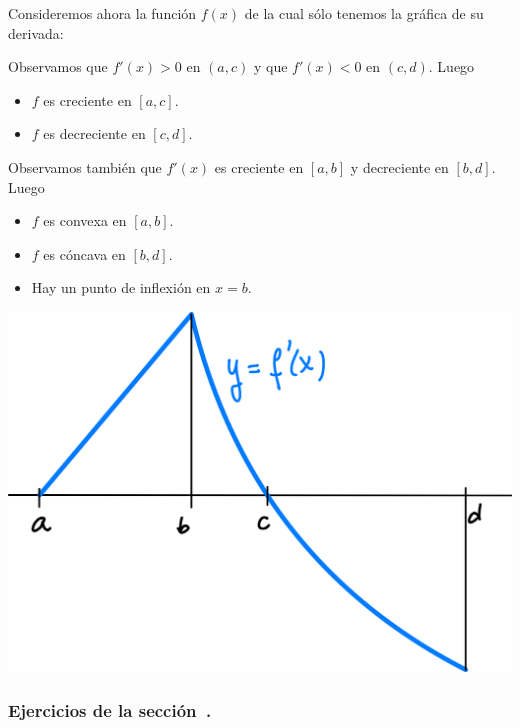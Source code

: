 \begin{example}
    Consideremos ahora la función $f(x)$ de la cual sólo tenemos la gráfica de su derivada:

    \noindent
    \begin{minipage}{.5\textwidth}
        Observamos que $f'(x)>0$ en $(a,c)$ y que $f'(x)<0$ en $(c,d)$. Luego
        \begin{itemize}
            \item $f$ es creciente en $[a,c]$.
            \item $f$ es decreciente en $[c,d]$.
        \end{itemize}
        Observamos también que $f'(x)$ es creciente en $[a,b]$ y decreciente en $[b,d]$. Luego
        \begin{itemize}
            \item $f$ es convexa en $[a,b]$.
            \item $f$ es cóncava en $[b,d]$.
            \item Hay un punto de inflexión en $x=b$.
        \end{itemize}
        \end{minipage}
    \begin{minipage}{.5\textwidth}
        \centering
        \includegraphics[width=.9\textwidth]{pics/f-prima-ej-1.png}
    \end{minipage}
\end{example}

\subsubsection*{Ejercicios de la sección~.}

